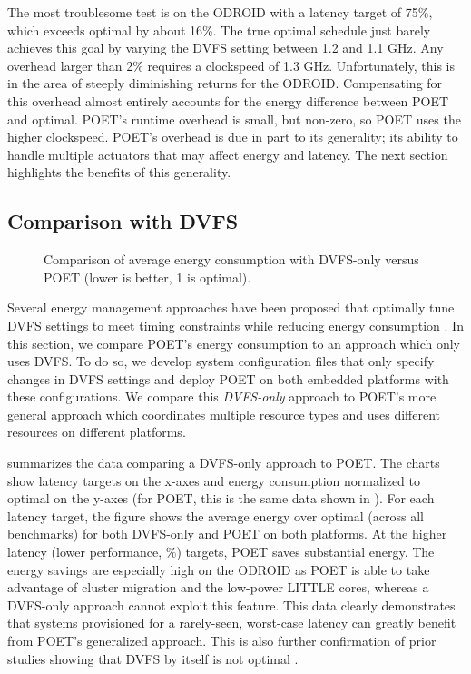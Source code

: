 The most troublesome test is  on the ODROID with a latency target of 75\%, which exceeds optimal by about 16\%.
The true optimal schedule just barely achieves this goal by varying the DVFS setting between 1.2 and 1.1 GHz.
Any overhead larger than 2\% requires a clockspeed of 1.3 GHz.
Unfortunately, this is in the area of steeply diminishing returns for the ODROID.
Compensating for this overhead almost entirely accounts for the energy difference between POET and optimal.
POET's runtime overhead is small, but non-zero, so POET uses the higher clockspeed.
POET's overhead is due in part to its generality; \ie its ability to handle multiple actuators that may affect energy and latency.
The next section highlights the benefits of this generality.


\subsection{Comparison with DVFS}

\begin{figure}[t]
  \centering
  
  \caption{Comparison of average energy consumption with DVFS-only versus POET (lower is better, 1 is optimal).}
  \label{fig:poet-embedded-dvfs-compare}
\end{figure}

Several energy management approaches have been proposed that optimally tune DVFS settings to meet timing constraints while reducing energy consumption \cite{Albers}.
In this section, we compare POET's energy consumption to an approach which only uses DVFS.
To do so, we develop system configuration files that only specify changes in DVFS settings and deploy POET on both embedded platforms with these configurations.
We compare this \emph{DVFS-only} approach to POET's more general approach which coordinates multiple resource types and uses different resources on different platforms.

 summarizes the data comparing a DVFS-only approach to POET.
The charts show latency targets on the x-axes and energy consumption normalized to optimal on the y-axes (for POET, this is the same data shown in ).
For each latency target, the figure shows the average energy over optimal (across all benchmarks) for both DVFS-only and POET on both platforms.
At the higher latency (lower performance, \%) targets, POET saves substantial energy.
The energy savings are especially high on the ODROID as POET is able to take advantage of cluster migration and the low-power LITTLE cores, whereas a DVFS-only approach cannot exploit this feature.
This data clearly demonstrates that systems provisioned for a rarely-seen, worst-case latency can greatly benefit from POET's generalized approach.
This is also further confirmation of prior studies showing that DVFS by itself is not optimal \cite{Hoffmann2012,MeisnerISCA2011}.


